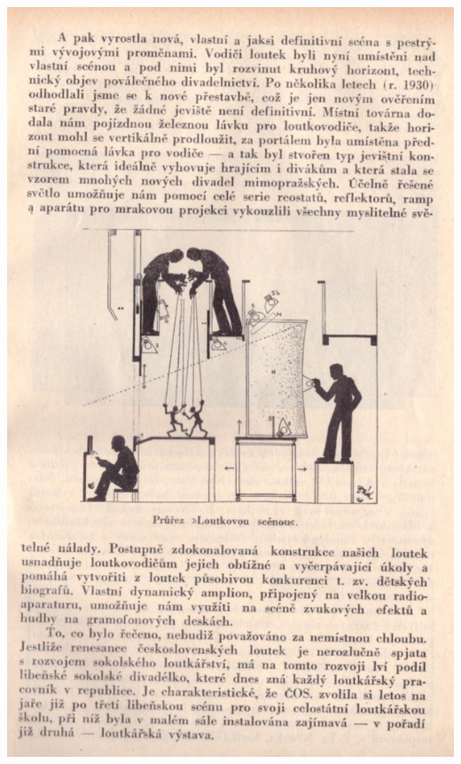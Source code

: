\documentclass[11pt]{article}
\begin{document}
\includegraphics[width=\imagewidth]{original/1934/Skener_20250325 (12).jpg}
\end{document}
